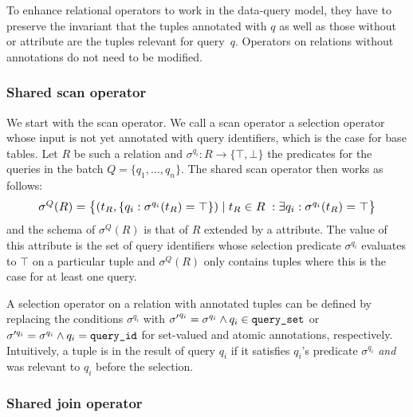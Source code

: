 To enhance relational operators to work in the data-query model, they have to
preserve the invariant that the tuples annotated with $q$
as well as those without \qid or
\qset attribute are the tuples relevant for query~$q$.  Operators on relations
without annotations do not need to be modified.

\subsubsection{Shared scan operator}

We start with the scan operator.  We call a scan operator a selection operator
whose input is not yet annotated with query identifiers, which is the case for
base tables.  Let $R$ be such a relation and $\sigma^{q_i} : R \rightarrow
\{\top,\bot\}$ the predicates for the queries in the batch $Q = \{q_1, \ldots,
q_n\}$.  The shared scan operator then works as follows:
%
\begin{equation}
  \resizebox{.9\hsize}{!}{
      $\sigma^Q(R) = \big\{ (t_R, \{q_i : \sigma^{q_i}(t_R)  = \top \} ) \; | \; t_R \in R \; : \exists q_i : \sigma^{q_i}(t_R)  = \top \big\}$
    }
  \label{eqn:shared_scan}
\end{equation}
%
and the schema of $\sigma^Q(R)$ is that of $R$ extended by a \qset attribute.
The value of this attribute is the set of query identifiers whose selection
predicate $\sigma^{q_i}$ evaluates to $\top$ on a particular tuple and
$\sigma^Q(R)$ only contains tuples where this is the case for at least one
query.

A selection operator on a relation with annotated tuples can be defined by
replacing the conditions $\sigma^{q_i}$ with ${\sigma'}^{q_i} = \sigma^{q_i}
\wedge q_i \in \text{\texttt{query\_set}}$ or ${\sigma}'^{q_i} = \sigma^{q_i} \wedge q_i =
\text{{\texttt{query\_id}}}$ for set-valued and atomic annotations, respectively.  Intuitively,
a tuple is in the result of query $q_i$ if it satisfies $q_i$'s predicate
$\sigma^{q_i}$ \emph{and} was relevant to $q_i$ before the selection.

\subsubsection{Shared join operator}

